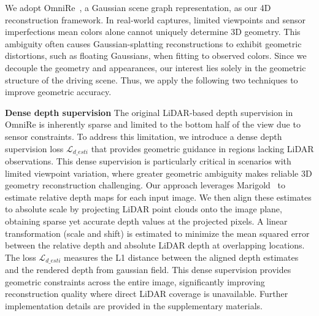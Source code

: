 We adopt OmniRe~\cite{chen2025omnire}, a Gaussian scene graph representation, as our 4D reconstruction framework. In real‑world captures, limited viewpoints and sensor imperfections mean colors alone cannot uniquely determine 3D geometry.
This ambiguity often causes Gaussian-splatting reconstructions to exhibit geometric distortions, such as floating Gaussians, when fitting to observed colors.
Since we decouple the geometry and appearances, our interest lies solely in the geometric structure of the driving scene.
Thus, we apply the following two techniques to improve geometric accuracy.

\noindent \textbf{Dense depth supervision} 
The original LiDAR-based depth supervision in OmniRe is inherently sparse and limited to the bottom half of the view due to sensor constraints. To address this limitation, we introduce a dense depth supervision loss $\mathcal{L}_{d\_esti}$ that provides geometric guidance in regions lacking LiDAR observations. This dense supervision is particularly critical in scenarios with limited viewpoint variation, where greater geometric ambiguity makes reliable 3D geometry reconstruction challenging. Our approach leverages Marigold~\cite{ke2025marigold} to estimate relative depth maps for each input image. We then align these estimates to absolute scale by projecting LiDAR point clouds onto the image plane, obtaining sparse yet accurate depth values at the projected pixels. A linear transformation (scale and shift) is estimated to minimize the mean squared error between the relative depth and absolute LiDAR depth at overlapping locations. The loss $\mathcal{L}_{d\_esti}$ measures the L1 distance between the aligned depth estimates and the rendered depth from gaussian field. This dense supervision provides geometric constraints across the entire image, significantly improving reconstruction quality where direct LiDAR coverage is unavailable. Further implementation details are provided in the supplementary materials.



